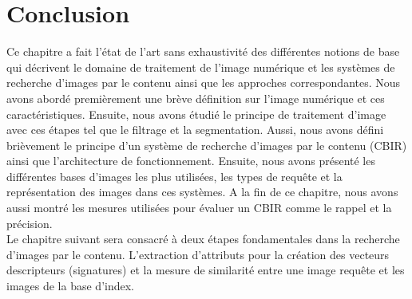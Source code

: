 

\section{Conclusion}
Ce chapitre a fait l’état de l’art sans exhaustivité des différentes notions de base qui décrivent le domaine de traitement de l'image numérique et les systèmes de  recherche d'images par le contenu ainsi que les approches correspondantes. Nous avons abordé premièrement une brève définition sur l’image numérique et ces caractéristiques. Ensuite, nous avons étudié le principe de traitement d’image avec ces étapes tel que le filtrage et la segmentation. Aussi, nous avons défini brièvement le principe d’un système de recherche d’images par le contenu (CBIR) ainsi que l’architecture de fonctionnement. Ensuite, nous avons présenté les différentes bases d’images les plus utilisées, les types de requête et la représentation des images dans ces systèmes. A la fin de ce chapitre, nous avons aussi montré les mesures utilisées pour évaluer un CBIR comme le rappel et la précision.\\

Le chapitre suivant sera consacré à deux étapes fondamentales dans la
recherche d’images par le contenu. L’extraction d’attributs pour la création des vecteurs descripteurs (signatures) et la mesure de similarité entre une image requête et les images de la base d'index.

